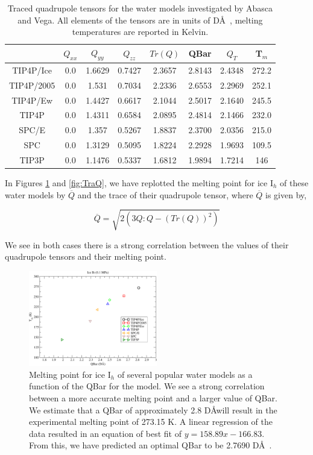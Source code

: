 \documentclass[aps, jcp, prl, reprint, groupedaddress, superscriptaddress, twocolumn]{revtex4-1}
\begin{document}
\begin{table}[h!]
\begin{tabular}{|c|c|c|c|c|c|c|c|}
\hline
& $Q_{xx}$ & $Q_{yy}$ & $Q_{zz}$ & $Tr(Q)$ & QBar & $Q_{T}$ & T$_{m}$ \\
\hline
TIP4P/Ice & 0.0 & 1.6629 & 0.7427 & 2.3657 & 2.8143 & 2.4348  & 272.2 \\
TIP4P/2005 & 0.0 & 1.531 & 0.7034 & 2.2336 & 2.6553 & 2.2969  & 252.1 \\
TIP4P/Ew & 0.0 & 1.4427 & 0.6617 & 2.1044  & 2.5017 & 2.1640  & 245.5   \\
TIP4P & 0.0 & 1.4311 & 0.6584 & 2.0895 & 2.4814 & 2.1466 & 232.0 \\
SPC/E & 0.0 & 1.357 & 0.5267 & 1.8837 & 2.3700 & 2.0356 & 215.0 \\
SPC & 0.0 & 1.3129 & 0.5095 & 1.8224 & 2.2928 & 1.9693 & 109.5 \\
TIP3P & 0.0 & 1.1476 & 0.5337 & 1.6812 & 1.9894 & 1.7214 & 146 \\
\hline
\end{tabular}
\caption{Traced quadrupole tensors for the water models investigated by Abasca and Vega. All elements of the tensors are in units of D\AA~, melting temperatures are reported in Kelvin.}
\label{Models_quad}
\end{table} 

In Figures \ref{fig:QBar} and \ref{fig:TraQ},
we have replotted the 
melting point for ice I$_h$ of these water models by $\overline{Q}$ and the 
trace of their
quadrupole tensor, where $\overline{Q}$ is given by,

\begin{equation}
\overline{Q} = \sqrt{2(3 Q:Q - (Tr(Q))^{2})}
\end{equation}

We see in both cases there is a strong correlation between
the values of their quadrupole tensors and their melting point.

\begin{figure}[h!]
\includegraphics[width = 0.5\textwidth]{Tm_Ih_Qbar_plot.pdf}
\caption{\label{fig:QBar} Melting point for ice I$_h$ of several popular water models as a function of the QBar for the model. We see a strong correlation between a more accurate melting point and a larger value of QBar. We estimate that a QBar of approximately 2.8 D\AA will result in the experimental melting point of 273.15 K. A linear regression of the data resulted in an equation of best fit of $y = 158.89x - 166.83$. From this, we have predicted an optimal QBar to be 2.7690 D\AA~.}
\end{figure}
\end{document}
